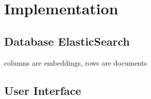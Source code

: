 \chapter{Implementation}\label{ch:implementation}

\section{Database ElasticSearch}\label{subsec:db}
columns are embeddings, rows are documents

\section{User Interface}\label{sec:ui}